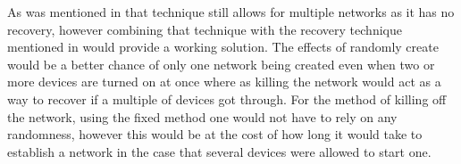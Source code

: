 \bigskip \noindent
As was mentioned in  that technique still allows for multiple networks as it has no recovery, however combining that technique with the recovery technique mentioned in  would provide a working solution.
The effects of randomly create would be a better chance of only one network being created even when two or more devices are turned on at once where as killing the network would act as a way to recover if a multiple of devices got through.
For the method of killing off the network, using the fixed method one would not have to rely on any randomness, however this would be at the cost of how long it would take to establish a network in the case that several devices were allowed to start one.